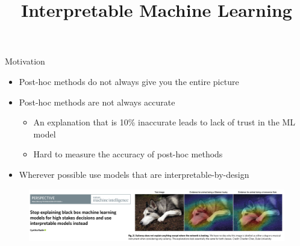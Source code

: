 \documentclass[11pt,compress,t,notes=noshow, aspectratio=169, xcolor=table]{beamer}
\title{Interpretable Machine Learning}
\date{}
\begin{document}
	\graphicspath{ {./figure/} }

 
\newcommand{\titlefigure}{figure/bild2}
\newcommand{\learninggoals}{
\item Interpretability by sparsity
\item Regularisation for interpretability
\item Sequential feature selection}



\begin{frame}{Motivation}
    \begin{itemize}
        \item Post-hoc methods do not always give you the entire picture
        \item Post-hoc methods are not always accurate
        \begin{itemize}
            \item An explanation that is 10\% inaccurate leads to lack of trust in the ML model
            \item Hard to measure the accuracy of post-hoc methods
        \end{itemize}
        \item Wherever possible use models that are interpretable-by-design
    \end{itemize}
    \begin{figure}
        \centering
        \includegraphics[scale=.4]{bild1}
    \end{figure}
\end{frame}
\end{document}
